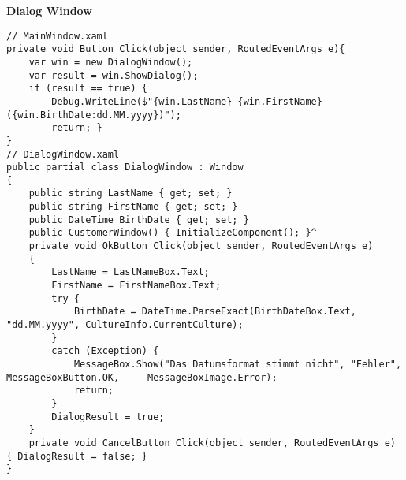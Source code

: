 \textbf{Dialog Window}
\begin{lstlisting}
// MainWindow.xaml
private void Button_Click(object sender, RoutedEventArgs e){
	var win = new DialogWindow();
	var result = win.ShowDialog();
	if (result == true) { 
		Debug.WriteLine($"{win.LastName} {win.FirstName} ({win.BirthDate:dd.MM.yyyy})");
		return; }
}
// DialogWindow.xaml
public partial class DialogWindow : Window
{
	public string LastName { get; set; }
	public string FirstName { get; set; }
	public DateTime BirthDate { get; set; }
	public CustomerWindow() { InitializeComponent(); }^
	private void OkButton_Click(object sender, RoutedEventArgs e)
	{
		LastName = LastNameBox.Text;
		FirstName = FirstNameBox.Text;
		try {
			BirthDate = DateTime.ParseExact(BirthDateBox.Text, "dd.MM.yyyy", CultureInfo.CurrentCulture);
		}
		catch (Exception) {
			MessageBox.Show("Das Datumsformat stimmt nicht", "Fehler", MessageBoxButton.OK, 	MessageBoxImage.Error);
			return;
		}
		DialogResult = true; 
	}
	private void CancelButton_Click(object sender, RoutedEventArgs e) { DialogResult = false; }
}
\end{lstlisting}